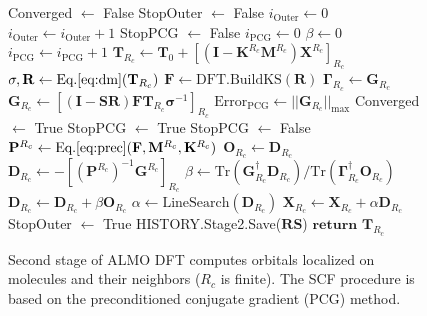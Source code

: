 \documentclass[aip,jcp,reprint,amsmath,amssymb]{revtex4-1}
\begin{document}
\begin{figure}
\begin{algorithm}[H]
\begin{algorithmic}[1]
	\State Converged $\gets$ False
	\State StopOuter $\gets$ False 
	\State $i_{\text{Outer}} \gets 0$ 
	\Repeat {}
		\State $i_{\text{Outer}} \gets i_{\text{Outer}} + 1$ 
		\State StopPCG $\gets$ False 
		\State $i_{\text{PCG}} \gets 0$ 
		\State $\beta \gets 0$ 
		\Repeat {}
			\State $i_{\text{PCG}} \gets i_{\text{PCG}} + 1$ 
			\State $\mathbf{T}_{R_c} \gets \mathbf{T}_{0} + [(\mathbf{I} - \mathbf{K}^{R_c} \mathbf{M}^{R_c}) \mathbf{X}^{R_c}]_{R_c}$  \label{line:almos}
			\State $\mathbf{\sigma,R} \gets \text{Eq.\ref{eq:dm}}(\mathbf{T}_{R_c})$ 
			\State $\mathbf{F} \gets \text{DFT.BuildKS}(\mathbf{R})$ 
				\State $\mathbf{\Gamma}_{R_c} \gets \mathbf{G}_{R_c}$ 
			\EndIf 
			\State $\mathbf{G}_{R_c} \gets [ (\mathbf{I} - \mathbf{SR}) \mathbf{FT}_{R_c} \mathbf{\sigma}^{-1}]_{R_c}$ 
			\State $\text{Error}_\text{PCG} \gets \vert\vert \mathbf{G}_{R_c} \vert \vert_{\text{max}}$
				\State Converged $\gets$ True
			\EndIf
				\State StopPCG $\gets$ True
			\EndIf
				\State StopPCG $\gets$ False 
			\EndIf
					\State $\mathbf{P}^{R_c} \gets \text{Eq.\ref{eq:prec}}(\mathbf{F},\mathbf{M}^{R_c},\mathbf{K}^{R_c}) $
				\Else
					\State $\mathbf{O}_{R_c} \gets \mathbf{D}_{R_c}$ 
				\EndIf
				\State $\mathbf{D}_{R_c} \gets - [(\mathbf{P}^{R_c})^{-1} \mathbf{G}^{R_c}]_{R_c}$ 
					\State $\beta \gets \text{Tr}(\mathbf{G}^{\dagger}_{R_c} \mathbf{D}_{R_c})/\text{Tr}(\mathbf{\Gamma}^{\dagger}_{R_c}\mathbf{O}_{R_c})$
				\EndIf 
				\State $\mathbf{D}_{R_c} \gets \mathbf{D}_{R_c} + \beta \mathbf{O}_{R_c}$ 
				\State $\alpha \gets \text{LineSearch}(\mathbf{D}_{R_c})$ 
				\State $\mathbf{X}_{R_c} \gets \mathbf{X}_{R_c} + \alpha \mathbf{D}_{R_c}$ 
			\EndIf
			\State StopOuter $\gets$ True
		\EndIf
	\State HISTORY.Stage2.Save($\mathbf{RS}$) 
	\State $\mathbf{return}$ $\mathbf{T}_{R_c}$
	\EndProcedure
   \end{algorithmic}
\end{algorithm}
\caption{\label{fig:almoR} Second stage of ALMO DFT computes orbitals localized on molecules and their neighbors ($R_c$ is finite). The SCF procedure is based on the preconditioned conjugate gradient (PCG) method.}
\end{figure}
\end{document}
